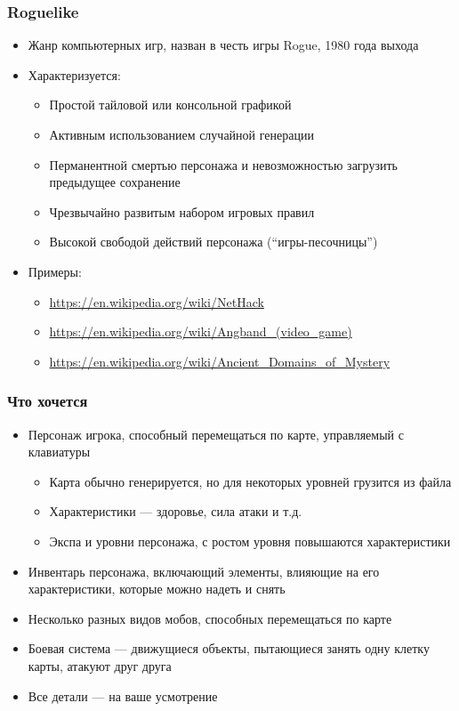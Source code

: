 \documentclass{../../slides-style}
\author[Юрий Литвинов]{Юрий Литвинов \newline \textcolor{gray}{\small\texttt{yurii.litvinov@gmail.com}}}
\begin{document}
		\maketitle

		\begin{frame}
		\frametitle{Roguelike}
		\begin{itemize}
			\item Жанр компьютерных игр, назван в честь игры Rogue, 1980 года выхода
			\item Характеризуется:
			\begin{itemize}
				\item Простой тайловой или консольной графикой
				\item Активным использованием случайной генерации
				\item Перманентной смертью персонажа и невозможностью загрузить предыдущее сохранение
				\item Чрезвычайно развитым набором игровых правил
				\item Высокой свободой действий персонажа (``игры-песочницы'')
			\end{itemize}
			\item Примеры:
			\begin{itemize}
				\item \url{https://en.wikipedia.org/wiki/NetHack}
				\item \url{https://en.wikipedia.org/wiki/Angband_(video_game)}
				\item \url{https://en.wikipedia.org/wiki/Ancient_Domains_of_Mystery}
			\end{itemize}
		\end{itemize}
	\end{frame}

	\begin{frame}
		\frametitle{Что хочется}
		\begin{itemize}
			\item Персонаж игрока, способный перемещаться по карте, управляемый с клавиатуры
			\begin{itemize}
				\item Карта обычно генерируется, но для некоторых уровней грузится из файла
				\item Характеристики --- здоровье, сила атаки и т.д.
				\item Экспа и уровни персонажа, с ростом уровня повышаются характеристики
			\end{itemize}
			\item Инвентарь персонажа, включающий элементы, влияющие на его характеристики, которые можно надеть и снять
			\item Несколько разных видов мобов, способных перемещаться по карте
			\item Боевая система --- движущиеся объекты, пытающиеся занять одну клетку карты, атакуют друг друга
			\item Все детали --- на ваше усмотрение
		\end{itemize}
	\end{frame}
\end{document}
